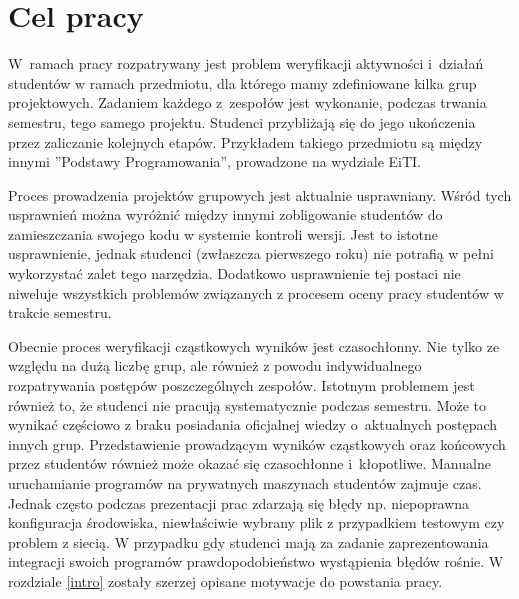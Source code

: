 \chapter{Cel pracy}

W~ramach pracy rozpatrywany jest problem weryfikacji aktywności i~działań studentów w ramach przedmiotu, dla którego mamy zdefiniowane kilka grup projektowych.
Zadaniem każdego z~zespołów jest wykonanie, podczas trwania semestru, tego samego projektu.
Studenci przybliżają się do jego ukończenia przez zaliczanie kolejnych etapów.
Przykładem takiego przedmiotu są między innymi ”Podstawy Programowania”, prowadzone na wydziale EiTI.

Proces prowadzenia projektów grupowych jest aktualnie usprawniany.
Wśród tych usprawnień można wyróżnić między innymi zobligowanie studentów do zamieszczania swojego kodu w systemie kontroli wersji.
Jest to istotne usprawnienie, jednak studenci (zwłaszcza pierwszego roku) nie potrafią w pełni wykorzystać zalet tego narzędzia.
Dodatkowo usprawnienie tej postaci nie niweluje wszystkich problemów związanych z procesem oceny pracy studentów w trakcie semestru.

Obecnie proces weryfikacji cząstkowych wyników jest czasochłonny.
Nie tylko ze względu na dużą liczbę grup, ale również z powodu indywidualnego rozpatrywania postępów poszczególnych zespołów.
Istotnym problemem jest również to, że studenci nie pracują systematycznie podczas semestru.
Może to wynikać częściowo z braku posiadania oficjalnej wiedzy o~aktualnych postępach innych grup.
Przedstawienie prowadzącym wyników cząstkowych oraz końcowych przez studentów również może okazać się czasochłonne i~kłopotliwe.
Manualne uruchamianie programów na prywatnych maszynach studentów zajmuje czas.
Jednak często podczas prezentacji prac zdarzają się błędy np. niepoprawna konfiguracja środowiska, niewłaściwie wybrany plik z przypadkiem testowym czy problem z siecią.
W przypadku gdy studenci mają za zadanie zaprezentowania integracji swoich programów prawdopodobieństwo wystąpienia błędów rośnie.
W rozdziale \ref{intro} zostały szerzej opisane motywacje do powstania pracy.

